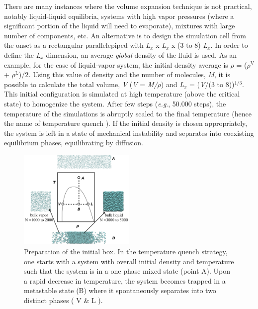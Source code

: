 \documentclass[9pt,bestpractices]{livecoms}
\begin{document}
\begin{mdframed}[linewidth=0pt,backgroundcolor=LiveCoMSLightBlue!8,fontcolor=LiveCoMSDarkBlue!80!black]
There are many instances where the volume expansion technique is not practical,
notably liquid-liquid equilibria, systems with high vapor pressures (where
a significant portion of the liquid will need to evaporate), mixtures with
large number of components, etc.  An alternative is to design the simulation
cell from the onset as a rectangular parallelepiped with \textit{L}$_{x}$
x \textit{L}$_{x}$ x (3 to 8) \textit{L}$_{x}$. In order to define the
\textit{L}$_{x}$ dimension, an average \textit{global} density of the fluid is
used. As an example, for the case of liquid-vapor system, the initial density
average is ${\rho}$ = (${\rho}$$^{\mathrm{V}}$
+ ${\rho}$$^{\mathrm{L}}$)/2\textit{.} Using this value of density and the
number of molecules, \textit{M}, it is possible to calculate the total volume,
\textit{V} (\textit{V} = \textit{M/${\rho}$}) and \textit{L}$_{x}$
= (\textit{V}/(3 to 8))$^{\mathrm{1/3}}$. This initial configuration is
simulated at high temperature (above the critical state) to homogenize the
system. After few steps (\textit{e.g}., 50.000 steps), the temperature of the
simulations is abruptly scaled to the final temperature (hence the name of
temperature quench \citep{martinez2005}).  If the initial
density is chosen appropriately, the system is left in a state of mechanical
instability and separates into coexisting equilibrium phases, equilibrating by
diffusion.
\end{mdframed}

\begin{figure}
  \includegraphics[width=0.5\textwidth]{gfx/image19.png}
  \caption{Preparation of the initial box. In the temperature quench strategy, one starts with a system with overall initial density and temperature such that the system is in a one phase mixed state (point A). Upon a rapid decrease in temperature, the system becomes trapped in a metastable state (B) where it spontaneously separates into two distinct phases ( V \& L ). }
  \label{fig:4}
\end{figure}
\end{document}
